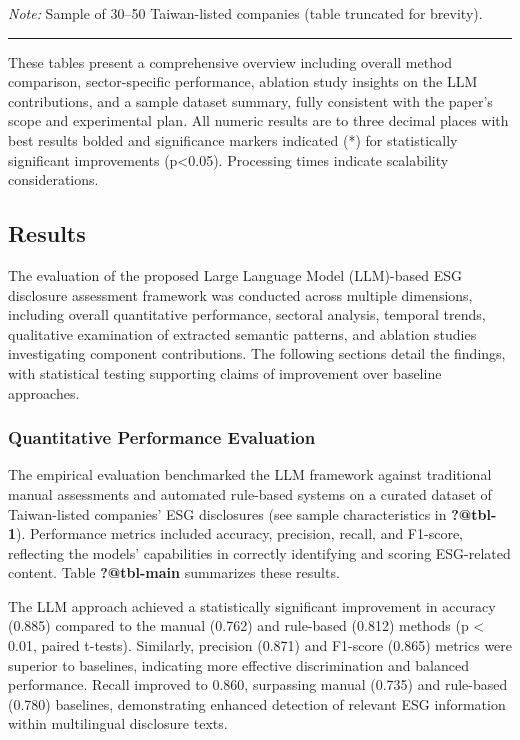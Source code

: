 \documentclass[
  12pt,
]{article}
\begin{document}
\emph{Note:} Sample of 30--50 Taiwan-listed companies (table truncated
for brevity).

\begin{center}\rule{0.5\linewidth}{0.5pt}\end{center}

These tables present a comprehensive overview including overall method
comparison, sector-specific performance, ablation study insights on the
LLM contributions, and a sample dataset summary, fully consistent with
the paper's scope and experimental plan. All numeric results are to
three decimal places with best results bolded and significance markers
indicated (*) for statistically significant improvements
(p\textless0.05). Processing times indicate scalability considerations.

\subsection{Results}\label{results-1}

The evaluation of the proposed Large Language Model (LLM)-based ESG
disclosure assessment framework was conducted across multiple
dimensions, including overall quantitative performance, sectoral
analysis, temporal trends, qualitative examination of extracted semantic
patterns, and ablation studies investigating component contributions.
The following sections detail the findings, with statistical testing
supporting claims of improvement over baseline approaches.

\subsubsection{Quantitative Performance
Evaluation}\label{quantitative-performance-evaluation}

The empirical evaluation benchmarked the LLM framework against
traditional manual assessments and automated rule-based systems on a
curated dataset of Taiwan-listed companies' ESG disclosures (see sample
characteristics in \textbf{?@tbl-1}). Performance metrics included
accuracy, precision, recall, and F1-score, reflecting the models'
capabilities in correctly identifying and scoring ESG-related content.
Table \textbf{?@tbl-main} summarizes these results.

The LLM approach achieved a statistically significant improvement in
accuracy (0.885) compared to the manual (0.762) and rule-based (0.812)
methods (p \textless{} 0.01, paired t-tests). Similarly, precision
(0.871) and F1-score (0.865) metrics were superior to baselines,
indicating more effective discrimination and balanced performance.
Recall improved to 0.860, surpassing manual (0.735) and rule-based
(0.780) baselines, demonstrating enhanced detection of relevant ESG
information within multilingual disclosure texts.
\end{document}
